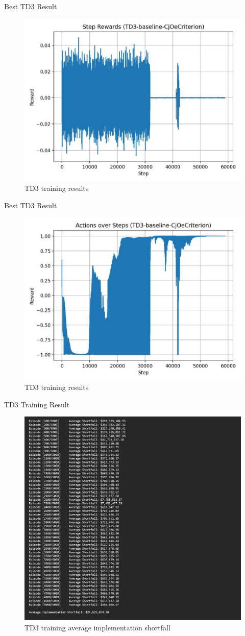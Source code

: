 \documentclass[11pt,aspectratio=169]{beamer}   %
\begin{document}
\begin{frame}{Best TD3 Result}
	\begin{figure}[ht]
		\centering
		\includegraphics[width=0.55\linewidth]{step_rewards.pdf}
		\caption{TD3 training results}
	\end{figure}
\end{frame}

\begin{frame}{Best TD3 Result}
	\begin{figure}[ht]
		\centering
		\includegraphics[width=0.55\linewidth]{actions.pdf}
		\caption{TD3 training results}
	\end{figure}
\end{frame}

\begin{frame}{TD3 Training Result}
	\begin{figure}[ht]
		\centering
		\includegraphics[width=0.4\linewidth]{training_td3.pdf}
		\caption{TD3 training average implementation shortfall}
	\end{figure}
\end{frame}
\end{document}

